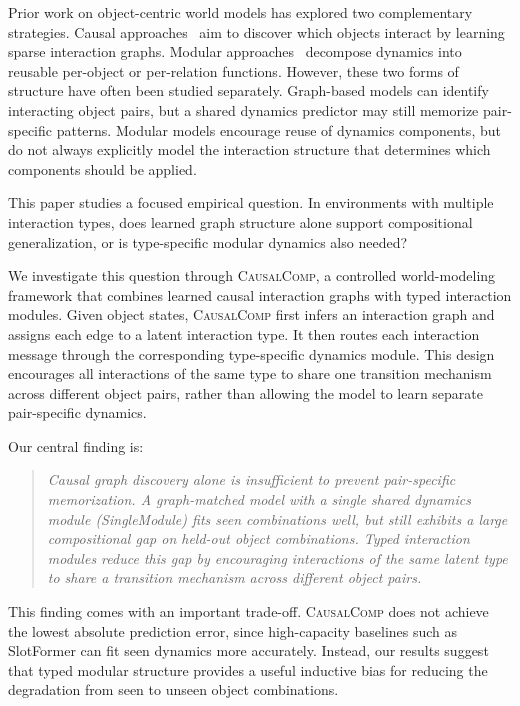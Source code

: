 \documentclass{article}
\newcommand{\ours}{\textsc{CausalComp}}
\begin{document}
Prior work on object-centric world models has explored two complementary strategies. Causal approaches~\citep{kipf2018nri,kipf2020cswm,oocdm2024,vcd2022} aim to discover which objects interact by learning sparse interaction graphs. Modular approaches~\citep{dreamweaver2025,fiocwm2025,battaglia2016interaction} decompose dynamics into reusable per-object or per-relation functions. However, these two forms of structure have often been studied separately. Graph-based models can identify interacting object pairs, but a shared dynamics predictor may still memorize pair-specific patterns. Modular models encourage reuse of dynamics components, but do not always explicitly model the interaction structure that determines which components should be applied.

This paper studies a focused empirical question. In environments with multiple interaction types, does learned graph structure alone support compositional generalization, or is type-specific modular dynamics also needed?

We investigate this question through \ours{}, a controlled world-modeling framework that combines learned causal interaction graphs with typed interaction modules. Given object states, \ours{} first infers an interaction graph and assigns each edge to a latent interaction type. It then routes each interaction message through the corresponding type-specific dynamics module. This design encourages all interactions of the same type to share one transition mechanism across different object pairs, rather than allowing the model to learn separate pair-specific dynamics.

Our central finding is:

\begin{quote}
\emph{Causal graph discovery alone is insufficient to prevent pair-specific memorization. A graph-matched model with a single shared dynamics module (SingleModule) fits seen combinations well, but still exhibits a large compositional gap on held-out object combinations. Typed interaction modules reduce this gap by encouraging interactions of the same latent type to share a transition mechanism across different object pairs.}
\end{quote}

This finding comes with an important trade-off. \ours{} does not achieve the lowest absolute prediction error, since high-capacity baselines such as SlotFormer can fit seen dynamics more accurately. Instead, our results suggest that typed modular structure provides a useful inductive bias for reducing the degradation from seen to unseen object combinations.
\end{document}
